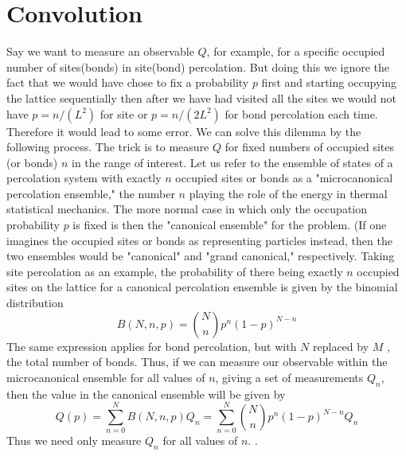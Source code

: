 


\chapter{Convolution}
\label{appendix2}
Say we want to measure an observable $Q$, for example, for a specific occupied number of sites(bonds) in site(bond) percolation. But doing this we ignore the fact that we would have chose to fix a probability $p$ first and starting occupying the lattice sequentially then after we have had visited all the sites we would not have $p=n/(L^2)$ for site or $p=n/(2 L^2)$ for bond percolation each time. Therefore it would lead to some error. We can solve this dilemma by the following process. 
The trick \cite{Hu1992, Gould2006} is to measure $Q$ for fixed numbers of occupied sites (or bonds) $n$ in the range of interest. Let us refer to the ensemble of states of a percolation system with exactly $n$ occupied sites or bonds as a "microcanonical percolation ensemble," the number $n$ playing the role of the energy in thermal statistical mechanics. The more normal case in which only the occupation probability $p$ is fixed is then the "canonical ensemble" for the problem. (If one imagines the occupied sites or bonds as representing particles instead, then the two ensembles would be "canonical" and "grand canonical," respectively. Taking site
percolation as an example, the probability of there being
exactly $n$ occupied sites on the lattice for a canonical percolation ensemble is given by the binomial distribution
	\begin{equation}
		B(N,n,p) = {N\choose n} p^n (1-p)^{N-n}
	\end{equation}
	The same expression applies for bond percolation, but
	with $N$ replaced by $M$ , the total number of bonds.	Thus, if we can measure our observable within the microcanonical ensemble for all values of $n$, giving a set
	of measurements ${Q_n}$, then the value in the canonical
	ensemble will be given by
	\begin{equation}
		Q(p) 
		= \sum_{n=0}^{N} B(N,n,p) Q_n 
		= \sum_{n=0}^{N} {N\choose n} p^n(1-p)^{N-n} Q_n 	
	\end{equation}
	Thus we need only measure $Q_n$ for all values of $n$.
	\cite{Newman2001}.
	
